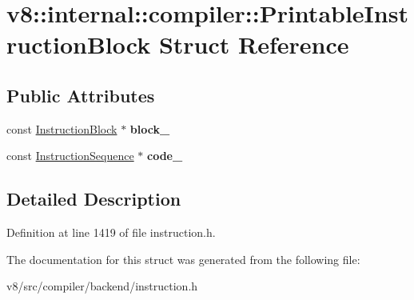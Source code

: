 \hypertarget{structv8_1_1internal_1_1compiler_1_1PrintableInstructionBlock}{}\section{v8\+:\+:internal\+:\+:compiler\+:\+:Printable\+Instruction\+Block Struct Reference}
\label{structv8_1_1internal_1_1compiler_1_1PrintableInstructionBlock}
\subsection*{Public Attributes}
\begin{DoxyCompactItemize}
\item 
\mbox{\label{structv8_1_1internal_1_1compiler_1_1PrintableInstructionBlock_a0b3e63f2e1f9a0bd1961551e6f12b900}} 
const \mbox{\hyperlink{classv8_1_1internal_1_1compiler_1_1InstructionBlock}{Instruction\+Block}} $\ast$ {\bfseries block\+\_\+}
\item 
\mbox{\label{structv8_1_1internal_1_1compiler_1_1PrintableInstructionBlock_a2f7c217a7525707b5bc9a9232dbc2d9f}} 
const \mbox{\hyperlink{classv8_1_1internal_1_1compiler_1_1InstructionSequence}{Instruction\+Sequence}} $\ast$ {\bfseries code\+\_\+}
\end{DoxyCompactItemize}


\subsection{Detailed Description}


Definition at line 1419 of file instruction.\+h.



The documentation for this struct was generated from the following file\+:\begin{DoxyCompactItemize}
\item 
v8/src/compiler/backend/instruction.\+h\end{DoxyCompactItemize}
